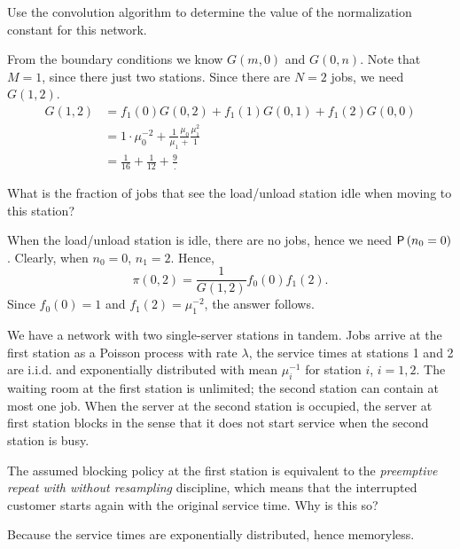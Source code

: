\begin{exercise}[201704]{2}
  Use the convolution algorithm to determine the value of the
  normalization constant for this network.
\begin{solution}
    From the boundary conditions we know $G(m, 0)$ and $G(0,n)$. Note
    that $M=1$, since there just two stations. Since there are $N=2$
    jobs, we need $G(1,2)$. 
    \begin{equation*}
      \begin{split}
      G(1,2) &= f_1(0) G(0, 2) + f_1(1) G(0, 1) + f_1(2) G(0,0) \\
       &= 1\cdot \mu_0^{-2}  + \frac1{\mu_1} \frac{\mu_0}  + \frac{\mu_1^2} 1 \\
       &= \frac 1{16} + \frac1{12}  + \frac{9}.
      \end{split}
    \end{equation*}
\end{solution}
\end{exercise}

\begin{exercise}[201704]
  What is the fraction of jobs that see the load/unload station idle
  when moving to this station?
\begin{solution}
    When the load/unload station is idle, there are no jobs, hence we need
      $\P{n_0=0}$. Clearly, when $n_0=0$, $n_1 = 2$. Hence,
    \begin{equation*}
\pi(0, 2) = \frac1{G(1,2)} f_0(0) f_1(2).
    \end{equation*}
Since $f_0(0) = 1$ and $f_1(2) = \mu_1^{-2}$, the answer follows.
\end{solution}
\end{exercise}

We have a network with two single-server stations in tandem. Jobs
arrive at the first station as a Poisson process with rate $\lambda$,
the service times at stations 1 and 2 are i.i.d. and exponentially
distributed with  mean $\mu_i^{-1}$ for station $i$, $i=1,2$. The waiting room at the first station is unlimited; the  second station can contain at most one job. When the server at the second station is occupied, the server at first station blocks in the sense that it does not start service when  the second station is busy. 

\begin{exercise}[201706]
  The assumed blocking  policy at the first station is equivalent to the \emph{preemptive repeat with without resampling} discipline, which means that the interrupted customer starts again with the original service time. Why is this so? 
\begin{solution}
  Because the service times are exponentially distributed, hence memoryless. 
\end{solution}
\end{exercise}

